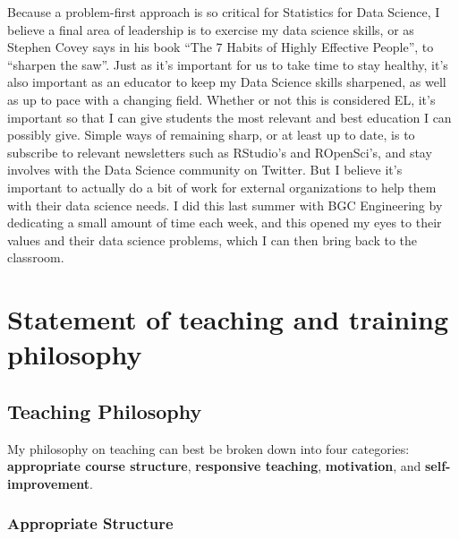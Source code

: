 \documentclass[]{article}
\begin{document}
Because a problem-first approach is so critical for Statistics for Data Science, I believe a final area of leadership is to exercise my data science skills, or as Stephen Covey says in his book ``The 7 Habits of Highly Effective People'', to ``sharpen the saw''. Just as it's important for us to take time to stay healthy, it's also important as an educator to keep my Data Science skills sharpened, as well as up to pace with a changing field. Whether or not this is considered EL, it's important so that I can give students the most relevant and best education I can possibly give. Simple ways of remaining sharp, or at least up to date, is to subscribe to relevant newsletters such as RStudio's and ROpenSci's, and stay involves with the Data Science community on Twitter. But I believe it's important to actually do a bit of work for external organizations to help them with their data science needs. I did this last summer with BGC Engineering by dedicating a small amount of time each week, and this opened my eyes to their values and their data science problems, which I can then bring back to the classroom.

\hypertarget{statement-of-teaching-and-training-philosophy}{%
\section{Statement of teaching and training philosophy}\label{statement-of-teaching-and-training-philosophy}}

\hypertarget{teaching-philosophy}{%
\subsection{Teaching Philosophy}\label{teaching-philosophy}}

My philosophy on teaching can best be broken down into four categories: \textbf{appropriate course structure}, \textbf{responsive teaching}, \textbf{motivation}, and \textbf{self-improvement}.

\hypertarget{appropriate-structure}{%
\subsubsection{Appropriate Structure}\label{appropriate-structure}}
\end{document}
